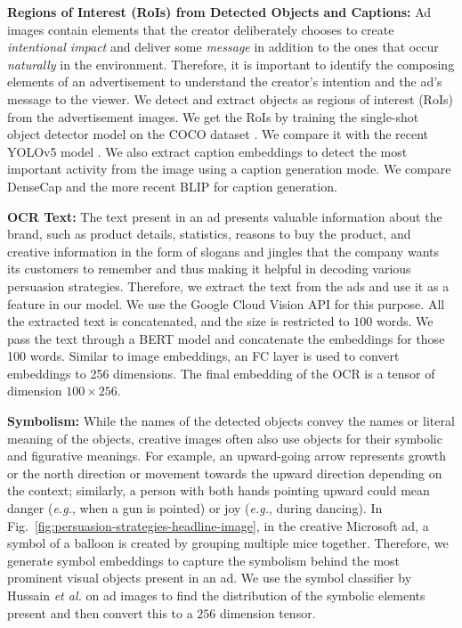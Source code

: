 \documentclass[hidelinks,11pt,a4paper]{report}
\renewcommand{\cite}[1]{\citep{#1}}
\begin{document}
\textbf{Regions of Interest (RoIs) from Detected Objects and Captions:} %
Ad images contain elements that the creator deliberately chooses to create \textit{intentional impact} and deliver some \textit{message} in addition to the ones that occur \textit{naturally} in the environment. Therefore, it is important to identify the composing elements of an advertisement to understand the creator's intention and the ad's message to the viewer. We detect and extract objects as regions of interest (RoIs) from the advertisement images. We get the RoIs by training the single-shot object detector model \cite{liu2016ssd} on the COCO dataset \cite{lin2014microsoft}. We compare it with the recent YOLOv5 model \cite{redmon2016you}. We also extract caption embeddings to detect the most important activity from the image using a caption generation mode. We compare DenseCap \cite{yang2017dense} and the more recent BLIP \cite{li2022blip} for caption generation.





\textbf{OCR Text:} The text present in an ad presents valuable information about the brand, such as product details, statistics, reasons to buy the product, and creative information in the form of slogans and jingles that the company wants its customers to remember and thus making it helpful in decoding various persuasion strategies. Therefore, we extract the text from the ads and use it as a feature in our model. We use the Google Cloud Vision API for this purpose. All the extracted text is concatenated, and the size is restricted to $100$ words. We pass the text through a BERT model and concatenate the embeddings for those 100 words. Similar to image embeddings, an FC layer is used to convert embeddings to 256 dimensions. The final embedding of the OCR is a tensor of dimension $100 \times 256$. 


\textbf{Symbolism:} While the names of the detected objects convey the names or literal meaning of the objects, creative images often also use objects for their symbolic and figurative meanings. For example, an upward-going arrow represents growth or the north direction or movement towards the upward direction depending on the context; similarly, a person with both hands pointing upward could mean danger (\textit{e.g.}, when a gun is pointed) or joy (\textit{e.g.}, during dancing). In Fig.~\ref{fig:persuasion-strategies-headline-image}, in the creative Microsoft ad, a symbol of a balloon is created by grouping multiple mice together. Therefore, we generate symbol embeddings to capture the symbolism behind the most prominent visual objects present in an ad. We use the symbol classifier by Hussain \textit{et al.} \cite{hussain2017automatic} on ad images to find the distribution of the symbolic elements present and then convert this to a $256$ dimension tensor. %
\end{document}
